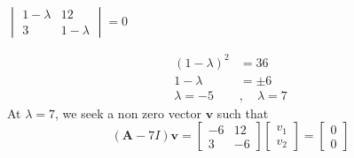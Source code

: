 \documentclass[]{article}
\begin{document}
\begin{example}
    \begin{center}
        $
            \begin{vmatrix}
                1-\lambda & 12        \\
                3         & 1-\lambda
            \end{vmatrix} = 0
        $
    \end{center}
    \begin{align*}
        (1-\lambda)^2      & = 36
        \\
        1-\lambda          & = \pm 6
        \\
        \lambda = -5 \quad & , \quad \lambda = 7
    \end{align*}
    At $\lambda = 7$, we seek a non zero vector $\mathbf{v}$ such that\\
    $$(\mathbf{A} - 7 I) \mathbf{v} =
        \begin{bmatrix}
            -6 & 12 \\
            3  & -6
        \end{bmatrix}
        \begin{bmatrix}
            v_{1} \\
            v_{2}
        \end{bmatrix}=
        \begin{bmatrix}
            0 \\
            0
        \end{bmatrix}
    $$
    \begin{comment}
    \begin{align*}
        \begin{bmatrix}
            1 & 12 \\
            3 & 1

\end{comment}
\end{example}
\end{document}
